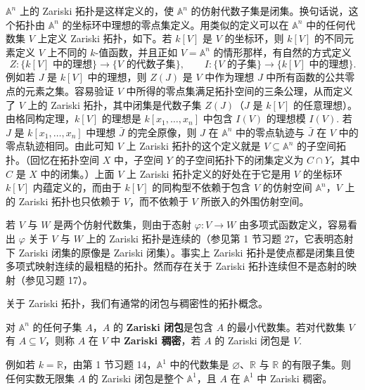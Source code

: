 \(\mathbb{A}^n\) 上的 Zariski 拓扑是这样定义的，使 \(\mathbb{A}^n\) 的仿射代数子集是闭集。换句话说，这个拓扑由 \(\mathbb{A}^n\) 的坐标环中理想的零点集定义。用类似的定义可以在 \(\mathbb{A}^n\) 中的任何代数集 \(V\) 上定义 Zariski 拓扑，如下。若 \(k[V]\) 是 \(V\) 的坐标环，则 \(k[V]\) 的不同元素定义 \(V\) 上不同的 \(k\)-值函数，并且正如 \(V = \mathbb{A}^n\) 的情形那样，有自然的方式定义
\[
Z : \{k[V] \text{ 中的理想}\} \to \{V \text{ 的代数子集}\}, \qquad I : \{V \text{ 的子集}\} \to \{k[V] \text{ 中的理想}\}.
\]
例如若 \(J\) 是 \(k[V]\) 中的理想，则 \(Z(J)\) 是 \(V\) 中作为理想 \(J\) 中所有函数的公共零点的元素之集。容易验证 \(V\) 中所得的零点集满足拓扑空间的三条公理，从而定义了 \(V\) 上的 Zariski 拓扑，其中闭集是代数子集 \(Z(J)\)（\(J\) 是 \(k[V]\) 的任意理想）。由格同构定理，\(k[V]\) 的理想是 \(k[x_1, \ldots, x_n]\) 中包含 \(I(V)\) 的理想模 \(I(V)\). 若 \(J\) 是 \(k[x_1, \ldots, x_n]\) 中理想 \(\bar J\) 的完全原像，则 \(J\) 在 \(\mathbb{A}^n\) 中的零点轨迹与 \(\bar J\) 在 \(V\) 中的零点轨迹相同。由此可知 \(V\) 上 Zariski 拓扑的这个定义就是 \(V \subseteq \mathbb{A}^n\) 的子空间拓扑。（回忆在拓扑空间 \(X\) 中，子空间 \(Y\) 的子空间拓扑下的闭集定义为 \(C \cap Y\)，其中 \(C\) 是 \(X\) 中的闭集。）上面 \(V\) 上 Zariski 拓扑定义的好处在于它是用 \(V\) 的坐标环 \(k[V]\) 内蕴定义的，而由于 \(k[V]\) 的同构型不依赖于包含 \(V\) 的仿射空间 \(\mathbb{A}^n\)，\(V\) 上的 Zariski 拓扑也只依赖于 \(V\)，而不依赖于 \(V\) 所嵌入的外围仿射空间。

若 \(V\) 与 \(W\) 是两个仿射代数集，则由于态射 \(\varphi : V \to W\) 由多项式函数定义，容易看出 \(\varphi\) 关于 \(V\) 与 \(W\) 上的 Zariski 拓扑是连续的（参见第 1 节习题 27，它表明态射下 Zariski 闭集的原像是 Zariski 闭集）。事实上 Zariski 拓扑是使点都是闭集且使多项式映射连续的最粗糙的拓扑。然而存在关于 Zariski 拓扑连续但不是态射的映射（参见习题 17）。

关于 Zariski 拓扑，我们有通常的闭包与稠密性的拓扑概念。

\begin{definition}
对 \(\mathbb{A}^n\) 的任何子集 \(A\)，\(A\) 的 \textbf{Zariski 闭包}是包含 \(A\) 的最小代数集。若对代数集 \(V\) 有 \(A \subseteq V\)，则称 \(A\) 在 \(V\) 中 \textbf{Zariski 稠密}，若 \(A\) 的 Zariski 闭包是 \(V\).
\end{definition}

例如若 \(k = \mathbb{R}\)，由第 1 节习题 14，\(\mathbb{A}^1\) 中的代数集是 \(\varnothing\)、\(\mathbb{R}\) 与 \(\mathbb{R}\) 的有限子集。则任何实数无限集 \(A\) 的 Zariski 闭包是整个 \(\mathbb{A}^1\)，且 \(A\) 在 \(\mathbb{A}^1\) 中 Zariski 稠密。

